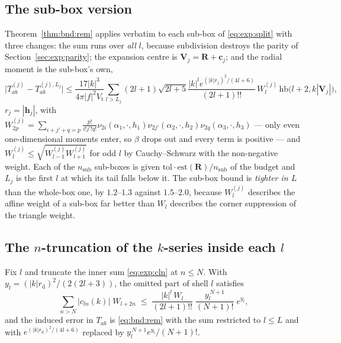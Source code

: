 \subsection{The sub-box version}
\label{sec:bnd:sub}

Theorem~\ref{thm:bnd:rem} applies verbatim to each sub-box of \eqref{eq:exp:split} with
three changes: the sum runs over \emph{all} $l$, because subdivision destroys the parity
of Section~\ref{sec:exp:parity}; the expansion centre is $\mathbf{V}_j =
\mathbf{R}+\mathbf{c}_j$; and the radial moment is the sub-box's own,
\begin{equation}
\bigl|T^{(j)}_{ab}-T^{(j),L_j}_{ab}\bigr| \le
\frac{17|k|^{3}}{4\pi|f|^{2}V_{\mathrm{t}}}\sum_{l>L_j}(2l+1)\sqrt{2l+5}
\frac{|k|^{l}e^{(|k|r_j)^{2}/(4l+6)}}{(2l+1)!!}\,W^{(j)}_l\,
\mathrm{hb}\bigl(l+2, k|\mathbf{V}_j|\bigr),
\label{eq:bnd:sub}
\end{equation}
$r_j = |\mathbf{h}_j|$, with
$W^{(j)}_{2p} = \sum_{i+j'+q=p}\frac{p!}{i!j'!q!}
\nu_{2i}(\alpha_1,\cdot,h_1)\nu_{2j'}(\alpha_2,\cdot,h_2)\nu_{2q}(\alpha_3,\cdot,h_3)$
--- only even one-dimensional moments enter, so $\beta$ drops out and every term is
positive --- and $W^{(j)}_l \le \sqrt{W^{(j)}_{l-1}W^{(j)}_{l+1}}$ for odd $l$ by
Cauchy--Schwarz with the non-negative weight. Each of the $n_{\mathrm{sub}}$ sub-boxes is
given $\mathrm{tol}\cdot\mathrm{est}(\mathbf{R})/n_{\mathrm{sub}}$ of the budget and
$L_j$ is the first $l$ at which its tail falls below it. The sub-box bound is
\emph{tighter in $L$} than the whole-box one, by $1.2$--$1.3$ against $1.5$--$2.0$,
because $W^{(j)}_l$ describes the affine weight of a sub-box far better than $W_l$
describes the corner suppression of the triangle weight.

\subsection{\texorpdfstring{The $n$-truncation of the $k$-series inside each $l$}{The n-truncation of the k-series inside each l}}
\label{sec:bnd:n}

\begin{theorem}[$n$-truncation]
\label{thm:bnd:n}
Fix $l$ and truncate the inner sum \eqref{eq:exp:cln} at $n \le N$. With
$y_l = (|k|r_{\mathrm{d}})^{2}/(2(2l+3))$, the omitted part of shell $l$ satisfies
\begin{equation}
\sum_{n>N}|c_{ln}(k)|\;W_{l+2n}
\;\le\;
\frac{|k|^{l}\,W_l}{(2l+1)!!}\;\frac{y_l^{\,N+1}}{(N+1)!}\;e^{y_l},
\label{eq:bnd:n}
\end{equation}
and the induced error in $T_{ab}$ is \eqref{eq:bnd:rem} with the sum restricted to
$l \le L$ and with $e^{(|k|r_{\mathrm{d}})^{2}/(4l+6)}$ replaced by
$y_l^{\,N+1}e^{y_l}/(N+1)!$.
\end{theorem}

